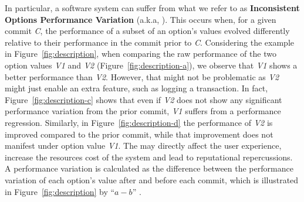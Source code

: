 In particular, a software system can suffer from what we refer to as \textbf{Inconsistent Options Performance Variation} (a.k.a, \inconsistent). This occurs when, for a given commit \emph{C}, the performance of a subset of an option's values evolved differently relative to their performance in the commit prior to \emph{C}. Considering the example in Figure~\ref{fig:description}, when comparing the raw performance of the two option values \emph{V1} and \emph{V2} (Figure~\ref{fig:description-a}), we observe that \emph{V1} shows a better performance than \emph{V2}. However, that might not be problematic as \emph{V2} might just enable an extra feature, such as logging a transaction. In fact, Figure~\ref{fig:description-c} shows that even if \emph{V2} does not show any significant performance variation from the prior commit, \emph{V1} suffers from a performance regression.  
Similarly, in Figure~\ref{fig:description-d} the performance of \emph{V2} is improved compared to the prior commit, while that improvement does not manifest under option value \emph{V1}. The \inconsistent may directly affect the user experience, increase the resources cost of the system and lead to reputational repercussions. %
A performance variation is calculated as the difference between the performance variation of each option's value after and before each commit, which is illustrated in Figure~\ref{fig:description} by ``$a - b$'' .


